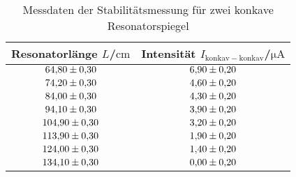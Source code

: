 \begin{table}
 \caption{Messdaten der Stabilitätsmessung für zwei konkave Resonatorspiegel}
 \label{tab:stabilitaetkk}
 \centering
{} \begin{tabular}{SS}
 \toprule 
    {Resonatorlänge $ L$/$\si{\centi\meter}$}& {Intensität $I_{\mathrm{konkav-konkav}}$/$\si{\micro\ampere}$} \\
     \midrule
     $\num{64.80 \pm 0.30}$ & $\num{6.90\pm0.20}$ \\
     $\num{74.20 \pm 0.30}$ & $\num{4.60\pm0.20}$ \\
     $\num{84.00 \pm 0.30}$ & $\num{4.30\pm0.20}$ \\
     $\num{94.10 \pm 0.30}$ & $\num{3.90\pm0.20}$ \\
     $\num{104.90 \pm 0.30}$ & $\num{3.20\pm0.20}$ \\
     $\num{113.90 \pm 0.30}$ & $\num{1.90\pm0.20}$ \\
     $\num{124.00 \pm 0.30}$ & $\num{1.40\pm0.20}$ \\
     $\num{134.10 \pm 0.30}$ & $\num{0.00\pm0.20}$ \\
 \bottomrule
 \end{tabular}
\end{table}